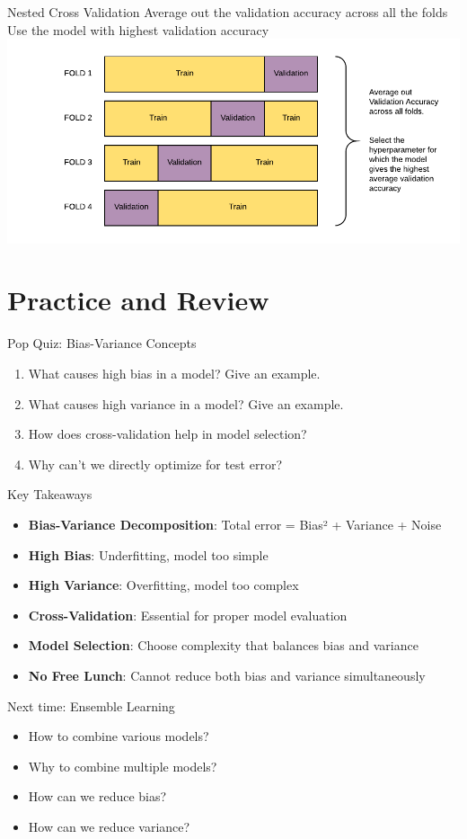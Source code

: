 \documentclass{beamer}
\begin{document}
	\begin{frame}{Nested Cross Validation}
	Average out the validation accuracy across all the folds\\
	Use the model with highest validation accuracy\\
	\includegraphics[width = \textwidth]{../assets/bias-variance/diagrams/cross-validation-avg}
	\end{frame}

\section{Practice and Review}

\begin{frame}{Pop Quiz: Bias-Variance Concepts}
\begin{enumerate}
\item What causes high bias in a model? Give an example.
\pause
\item What causes high variance in a model? Give an example.
\pause
\item How does cross-validation help in model selection?
\pause
\item Why can't we directly optimize for test error?
\end{enumerate}
\end{frame}

\begin{frame}{Key Takeaways}
\begin{itemize}[<+->]
\item \textbf{Bias-Variance Decomposition}: Total error = Bias² + Variance + Noise
\item \textbf{High Bias}: Underfitting, model too simple
\item \textbf{High Variance}: Overfitting, model too complex
\item \textbf{Cross-Validation}: Essential for proper model evaluation
\item \textbf{Model Selection}: Choose complexity that balances bias and variance
\item \textbf{No Free Lunch}: Cannot reduce both bias and variance simultaneously
\end{itemize}
\end{frame}

\begin{frame}{Next time: Ensemble Learning}
\begin{itemize}
	\item How to combine various models?
	\item Why to combine multiple models?
	\item How can we reduce bias?
	\item How can we reduce variance?
\end{itemize}
\end{frame}
\end{document}
